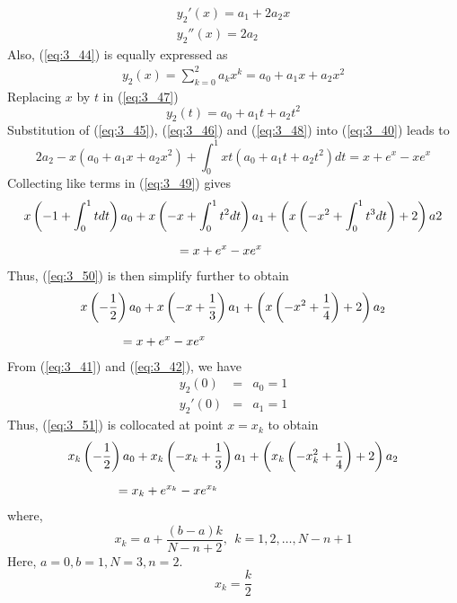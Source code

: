 \documentclass[12pt]{report}
\newcommand{\sps}{\\[0.2cm]}
\newcommand{\refn}[1]{(\ref{#1})}
\newcommand{\sprime}{'}
\newcommand{\dprime}{''}
\begin{document}
	\begin{eqnarray}
		y_2\sprime(x) = a_1 + 2a_2x \label{eq:3_45}\sps
		y_2\dprime(x) = 2a_2 \label{eq:3_46}
	\end{eqnarray}
	Also, \refn{eq:3_44} is equally expressed as
	\begin{eqnarray}
		y_2(x) = \sum_{k=0}^{2}a_kx^k = a_0 + a_1x+a_2x^2 \label{eq:3_47}
	\end{eqnarray}
	Replacing $x$ by $t$ in \refn{eq:3_47}
	\begin{equation}
		y_2(t) = a_0 + a_1t+a_2t^2 \label{eq:3_48}
	\end{equation}
	Substitution of \refn{eq:3_45}, \refn{eq:3_46} and \refn{eq:3_48} into \refn{eq:3_40} leads to
	\begin{equation}
		2a_2 - x(a_0 + a_1x+a_2x^2) + \int_0^1 xt(a_0 + a_1t+a_2t^2)dt = x+e^x - xe^x \label{eq:3_49}
	\end{equation}
	Collecting like terms in \refn{eq:3_49} gives
	\begin{eqnarray}
		x\left(-1 + \int_0^1tdt\right)a_0 + x\left(-x + \int_0^1t^2dt\right)a_1 + \left(x\left(-x^2 + \int_0^1t^3dt\right)+2\right)a2\notag \sps
		= x + e^x - xe^x~~~~~~~~~~~~~~~~~~~~~~~~~~~~~~~~~~~~~~~~~~~ \label{eq:3_50}
	\end{eqnarray}
	Thus, \refn{eq:3_50} is then simplify further to obtain
	\begin{eqnarray}
		x\left(-\frac{1}{2}\right)a_0 + x\left(-x + \frac{1}{3}\right)a_1 + \left(x\left(-x^2 + \frac{1}{4}\right)+2\right)a_2\notag \sps
		= x + e^x - xe^x~~~~~~~~~~~~~~~~~~~~~~~~~~~~~~~~~~~~~~~~~~~ \label{eq:3_51}
	\end{eqnarray}
	From \refn{eq:3_41} and \refn{eq:3_42}, we have
	\begin{eqnarray}
		y_2(0) &=& a_0 = 1 \label{eq:3_52} \sps
		y_2\sprime(0) &=& a_1 = 1\label{eq:3_53}
	\end{eqnarray}
	Thus, \refn{eq:3_51} is collocated at point $x=x_k$ to obtain
	\begin{eqnarray}
		x_k\left(-\frac{1}{2}\right)a_0 + x_k\left(-x_k + \frac{1}{3}\right)a_1 + \left(x_k\left(-x_k^2 + \frac{1}{4}\right)+2\right)a_2\notag \sps
		= x_k + e^{x_k} - xe^{x_k}~~~~~~~~~~~~~~~~~~~~~~~~~~~~~~~~~~~~~~~~~~~ \label{eq:3_54}
	\end{eqnarray}
	where,
	\begin{equation}
		x_k = a + \frac{(b-a)k}{N-n+2}, ~~ k=1,2,\ldots,N-n+1 \label{eq:3_55}
	\end{equation}
	Here, $a=0, b=1, N=3, n=2$.
	\begin{equation*}
		x_k = \frac{k}{2}
	\end{equation*}
\end{document}

